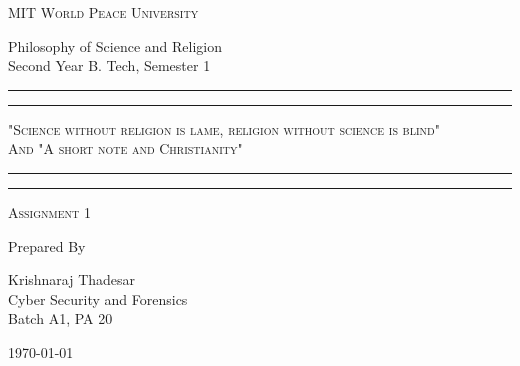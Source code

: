 \documentclass[11pt]{article}
\begin{document}
\begin{titlepage}
	\centering


	\huge\textsc{
		MIT World Peace University
	}\\

	\vspace{0.75\baselineskip} %

	\LARGE{
		Philosophy of Science and Religion\\
		Second Year B. Tech, Semester 1
	}

	\vfill %


	\rule{\textwidth}{1.6pt}\vspace*{-\baselineskip}\vspace*{2pt}
	\rule{\textwidth}{0.6pt}
	\vspace{0.75\baselineskip} %



	\huge{\textsc{
			"Science without religion is lame, religion without science is blind"\\
			And "A short note and Christianity"
		}} \\



	\vspace{0.5\baselineskip} %
	\rule{\textwidth}{0.6pt}\vspace*{-\baselineskip}\vspace*{2.8pt}
	\rule{\textwidth}{1.6pt}

	\vspace{1\baselineskip} %


	\LARGE\textsc{
		Assignment 1
	} %
	\vfill


	Prepared By
	\vspace{0.5\baselineskip} %

	\Large{
		Krishnaraj Thadesar \\
		Cyber Security and Forensics\\
		Batch A1, PA 20
	}


	\vspace{0.5\baselineskip} %
	\today
	
\end{titlepage}
\end{document}
